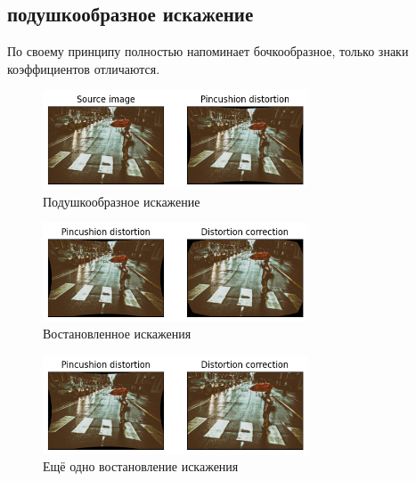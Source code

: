 \documentclass[a4paper,12pt]{article}
\begin{document}
\subsection{подушкообразное искажение}
По своему принципу полностью напоминает бочкообразное, только знаки коэффициентов отличаются. 
\begin{figure}[H]
    \centering \includegraphics[width=0.7\textwidth]{my_images/41.png}
    \caption{Подушкообразное искажение}
\end{figure}
\begin{figure}[H]
    \centering \includegraphics[width=0.7\textwidth]{my_images/42.png}
    \caption{Востановленное искажения}
\end{figure}
\begin{figure}[H]
    \centering \includegraphics[width=0.7\textwidth]{my_images/43.png}
    \caption{Ещё одно востановление искажения}
\end{figure}
\end{document}
